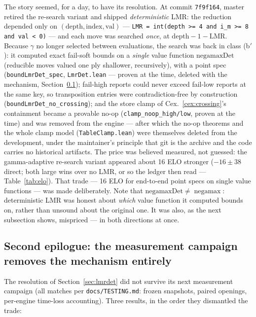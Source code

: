 \documentclass[11pt]{article}
\DeclareMathOperator{\negamax}{negamax}
\theoremstyle{plain}
\theoremstyle{definition}
\theoremstyle{remark}
\begin{document}
The story seemed, for a day, to have its resolution.  At commit
\texttt{7f9f164}, master
retired the re-search variant and shipped \emph{deterministic} LMR: the
reduction depended only on $(\mathrm{depth}, \mathrm{index},
\mathrm{val})$ --- \texttt{LMR = int(depth >= 4 and i\_m >= 8 and val <
0)} --- and each move was searched \emph{once}, at
$\mathrm{depth} - 1 - \mathrm{LMR}$.  Because $\gamma$ no longer
selected
between evaluations, the search was back in class (b$'$): it computed
exact fail-soft bounds on a \emph{single} value function
$\mathrm{negamaxDet}$ (reducible moves valued one ply shallower,
recursively), with a point spec (\texttt{boundLmrDet\_spec},
\texttt{LmrDet.lean} --- proven at the time, deleted with the
mechanism, Section~\ref{sec:removal}); fail-high reports could never
exceed fail-low reports at the same key, so transposition entries were
contradiction-free by construction
(\texttt{boundLmrDet\_no\_crossing}); and the store clamp of
Cex.~\ref{cex:crossing}'s containment became a provable no-op
(\texttt{clamp\_noop\_high/low}, proven at the time) and was removed
from the engine --- after which the no-op theorems and the whole clamp
model (\texttt{TableClamp.lean}) were themselves deleted from the
development, under the maintainer's principle that git is the archive
and the code carries no historical artifacts.  The
price was believed measured, not guessed: the gamma-adaptive re-search
variant appeared
about 16 ELO stronger ($-16 \pm 38$ direct; both large wins over no
LMR, or so the ledger then read --- Table~\ref{tab:elo}).  That trade
--- 16 ELO for end-to-end
point specs on single value functions --- was made deliberately.  Note
that $\mathrm{negamaxDet} \ne \negamax$: deterministic
LMR was honest about \emph{which} value function it computed bounds on,
rather than unsound about the original one.  It was also, as the next
subsection shows, mispriced --- in both directions at once.

\subsection{Second epilogue: the measurement campaign removes the
mechanism entirely}
\label{sec:removal}

The resolution of Section~\ref{sec:lmrdet} did not survive its next
measurement campaign (all matches per \texttt{docs/TESTING.md}: frozen
snapshots, paired openings, per-engine time-loss accounting).  Three
results, in the order they dismantled the trade:
\end{document}
